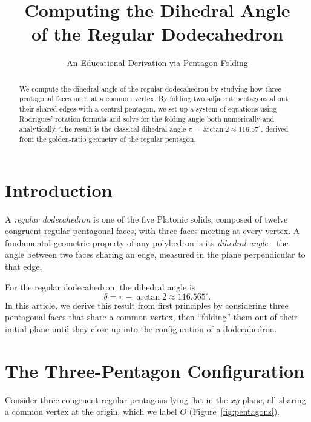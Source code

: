 \documentclass[11pt,a4paper]{article}
\title{\bfseries Computing the Dihedral Angle\\of the Regular Dodecahedron}
\author{An Educational Derivation via Pentagon Folding}
\date{}
\theoremstyle{definition}
\begin{document}
\maketitle

\begin{abstract}
We compute the dihedral angle of the regular dodecahedron by studying how three
pentagonal faces meet at a common vertex. By folding two adjacent pentagons about
their shared edges with a central pentagon, we set up a system of equations using
Rodrigues' rotation formula and solve for the folding angle both numerically and
analytically. The result is the classical dihedral angle
$\pi - \arctan 2 \approx 116.57^\circ$, derived from the golden-ratio geometry of
the regular pentagon.
\end{abstract}

\tableofcontents
\vspace{1em}

\section{Introduction}

A \emph{regular dodecahedron} is one of the five Platonic solids, composed of twelve
congruent regular pentagonal faces, with three faces meeting at every vertex. A
fundamental geometric property of any polyhedron is its \emph{dihedral angle}---the
angle between two faces sharing an edge, measured in the plane perpendicular to that
edge.

For the regular dodecahedron, the dihedral angle is
\[
  \delta = \pi - \arctan 2 \approx 116.565^\circ.
\]
In this article, we derive this result from first principles by considering three
pentagonal faces that share a common vertex, then ``folding'' them out of their
initial plane until they close up into the configuration of a dodecahedron.

\section{The Three-Pentagon Configuration}

Consider three congruent regular pentagons lying flat in the $xy$-plane, all sharing
a common vertex at the origin, which we label $O$ (Figure~\ref{fig:pentagons}).
\end{document}
